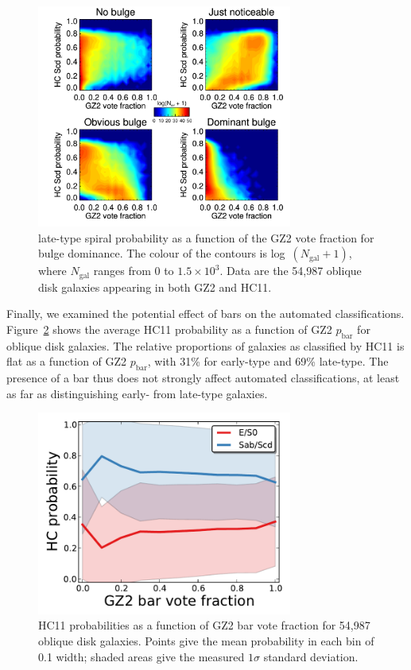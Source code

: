 \documentclass[useAMS,usenatbib]{mn2e}
\begin{document}
\begin{figure}
\includegraphics[angle=0,width=3.3in]{figures/hc_gz2_bulge_contour.pdf}
\caption{\citet{hue11} late-type spiral probability as a function of the GZ2 vote fraction for bulge dominance. The colour of the contours is log~$(N_\mathrm{gal} + 1)$, where $N_\mathrm{gal}$ ranges from 0 to $1.5\times10^3$. Data are the 54,987 oblique disk galaxies appearing in both GZ2 and HC11.
\label{fig-hc_gz2_bulge_contour}}
\end{figure}

Finally, we examined the potential effect of bars on the automated classifications. Figure~\ref{fig-hc_gz2_bar} shows the average HC11 probability as a function of GZ2 $p_\mathrm{bar}$ for oblique disk galaxies. The relative proportions of galaxies as classified by HC11 is flat as a function of GZ2 $p_\mathrm{bar}$, with 31\% for early-type and 69\% late-type. The presence of a bar thus does not strongly affect automated classifications, at least as far as distinguishing early- from late-type galaxies. 

\begin{figure}
\includegraphics[angle=0,width=3.3in]{figures/hc_gz2_bar.pdf}
\caption{HC11 probabilities as a function of GZ2 bar vote fraction for 54,987 oblique disk galaxies. Points give the mean probability in each bin of 0.1 width; shaded areas give the measured $1\sigma$ standard deviation. 
\label{fig-hc_gz2_bar}}
\end{figure}
\end{document}
